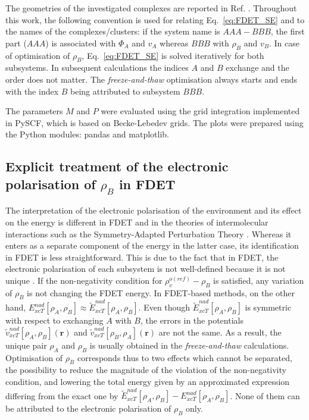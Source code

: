 \documentclass[amsmath,amssymb,preprint,aip,jcp]{revtex4-1}
\begin{document}

The geometries of the investigated complexes are reported in Ref. . 
Throughout this work, the following convention is used for relating Eq.~\ref{eq:FDET_SE} and to the names of the complexes/clusters: if the system name is $AAA-BBB$, the first part ($AAA$) is associated with $\Phi_A$ and  $v_A$ whereas $BBB$ with $\rho_B$ and $v_B$.
In case of optimisation of $\rho_B$, Eq.~\ref{eq:FDET_SE} is solved 
iteratively for both subsystems. In subsequent calculations the indices $A$ and $B$ exchange and the order does not matter.
The \textit{freeze-and-thaw} optimisation always starts and ends with the index $B$ being attributed to subsystem $BBB$. 
 
The parameters $M$ and $P$ were evaluated using the grid integration implemented in PySCF\cite{PYSCF}, which is based on Becke\cite{Becke1988b}-Lebedev\cite{Lebedev1999} grids. 
The plots were prepared using the Python modules: pandas\cite{PANDAS} and matplotlib\cite{Hunter2007}.

\subsection{Explicit treatment of the electronic polarisation of $\rho_B$ in FDET}\label{sect:pol_treat}
The interpretation of the electronic polarisation of the environment and its effect on the energy is different in FDET and in the theories of intermolecular interactions such as the Symmetry-Adapted Perturbation Theory \cite{Jeziorski1994}. Whereas it enters as a separate component of the energy in the latter case, its identification in FDET is less straightforward.
This is due to the fact that in FDET, the electronic polarisation of each subsystem is not well-defined because it is not unique \cite{Savin2009,HumbertDroz2014}. 
If  the non-negativity condition for $\rho_v^{o(ref)}-\rho_B$ is satisfied, any variation of $\rho_B$ is not changing the FDET energy. In FDET-based methods, on the other hand, ${E}_{xcT}^{nad}[\rho_A,\rho_B]\approx \tilde{E}_{xcT}^{nad}[\rho_A,\rho_B]$. 
Even though $\tilde{E}_{xcT}^{nad}[\rho_A,\rho_B]$
is symmetric with respect to exchanging $A$ with $B$, 
the errors in the potentials $\tilde{v}_{xcT}^{nad}[\rho_A,\rho_B](\mathbf{r})$ and $\tilde{v}_{xcT}^{nad}[\rho_B,\rho_A](\mathbf{r})$
 are not the same. 
As a result, the unique pair $\rho_A$ and $\rho_B$ is usually obtained in the \textit{freeze-and-thaw} calculations.\cite{Wesolowski1997a,Dulak2007a} 
Optimisation of $\rho_B$ corresponds thus to two effects which cannot be separated, the possibility to reduce the magnitude of the violation of the non-negativity condition, and lowering the total energy given by an approximated expression differing from the exact one by $\tilde{E}_{xcT}^{nad}[\rho_A,\rho_B]-{E}_{xcT}^{nad}[\rho_A,\rho_B]$. 
None of them can be attributed to the electronic polarisation of $\rho_B$ only. 
\end{document}
